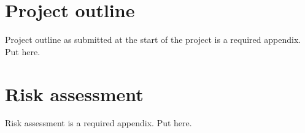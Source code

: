 \printbibliography[title={References},heading=bibintoc] %



\begin{uomappendix} 
    \section{Project outline}
    Project outline as submitted at the start of the project is a required appendix. Put here. 
    
    \section{Risk assessment}
    Risk assessment is a required appendix. Put here.
    
\end{uomappendix}


